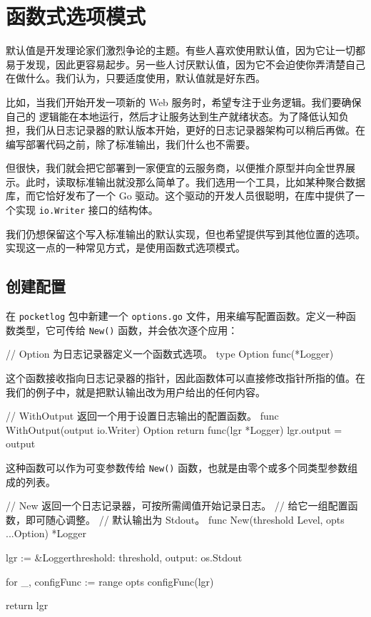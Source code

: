 \section{函数式选项模式}

默认值是开发理论家们激烈争论的主题。有些人喜欢使用默认值，因为它让一切都易于发现，因此更容易起步。另一些人讨厌默认值，因为它不会迫使你弄清楚自己在做什么。我们认为，只要适度使用，默认值就是好东西。

比如，当我们开始开发一项新的 Web 服务时，希望专注于业务逻辑。我们要确保自己的
逻辑能在本地运行，然后才让服务达到生产就绪状态。为了降低认知负担，我们从日志记录器的默认版本开始，更好的日志记录器架构可以稍后再做。在编写部署代码之前，除了标准输出，我们什么也不需要。

但很快，我们就会把它部署到一家便宜的云服务商，以便推介原型并向全世界展示。此时，读取标准输出就没那么简单了。我们选用一个工具，比如某种聚合数据库，而它恰好发布了一个 Go 驱动。这个驱动的开发人员很聪明，在库中提供了一个实现 \texttt{io.Writer} 接口的结构体。

我们仍想保留这个写入标准输出的默认实现，但也希望提供写到其他位置的选项。实现这一点的一种常见方式，是使用函数式选项模式。

\subsection{创建配置}

在 \texttt{pocketlog} 包中新建一个 \texttt{options.go} 文件，用来编写配置函数。定义一种函数类型，它可传给 \texttt{New()} 函数，并会依次逐个应用：

\begin{gocode}[]
// Option 为日志记录器定义一个函数式选项。
type Option func(*Logger)
\end{gocode}

这个函数接收指向日志记录器的指针，因此函数体可以直接修改指针所指的值。在我们的例子中，就是把默认输出改为用户给出的任何内容。

\begin{gocode}[title={代码清单 4.11 options.go：更改输出的可选函数}]
// WithOutput 返回一个用于设置日志输出的配置函数。
func WithOutput(output io.Writer) Option {
    return func(lgr *Logger) {
        lgr.output = output
    }
}
\end{gocode}

这种函数可以作为可变参数传给 \texttt{New()} 函数，也就是由零个或多个同类型参数组成的列表。

\begin{gocode}[title={代码清单 4.12 logger.go：应用选项}]
// New 返回一个日志记录器，可按所需阈值开始记录日志。
// 给它一组配置函数，即可随心调整。
// 默认输出为 Stdout。
func New(threshold Level, opts ...Option) *Logger {
    lgr := &Logger{threshold: threshold, output: os.Stdout}

    for _, configFunc := range opts {
        configFunc(lgr)
    }

    return lgr
}
\end{gocode}

